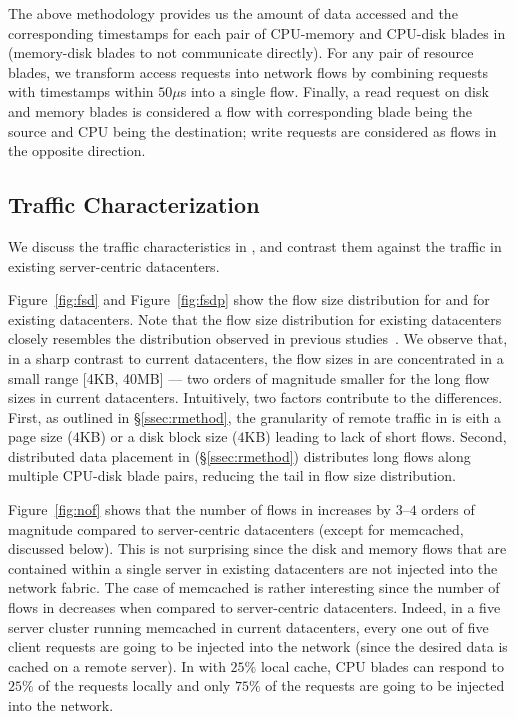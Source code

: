 The above methodology provides us the amount of data accessed and the corresponding timestamps for each pair of CPU-memory and CPU-disk blades in \dis (memory-disk blades to not communicate directly). For any pair of resource blades, we transform access requests into network flows by combining requests with timestamps within $50\mu$s into a single flow.  Finally, a read request on disk and memory blades is considered a flow with corresponding blade being the source and CPU being the destination; write requests are considered as flows in the opposite direction.

\subsection{Traffic Characterization} 
\label{ssec:flc}
We discuss the traffic characteristics in \dis, and contrast them against the traffic in existing server-centric datacenters.

Figure~\ref{fig:fsd} and Figure~\ref{fig:fsdp} show the flow size distribution for \dis and for existing datacenters. Note that the flow size distribution for existing datacenters closely resembles the distribution observed in previous studies~\cite{srikanth, theo}. We observe that, in a sharp contrast to current datacenters, the flow sizes in \dis are concentrated in a small range [4KB, 40MB] --- two orders of magnitude smaller for the long flow sizes in current datacenters. Intuitively, two factors contribute to the differences. First, as outlined in \S\ref{ssec:rmethod}, the granularity of remote traffic in \dis is eith a page size ($4$KB) or a disk block size ($4$KB) leading to lack of short flows. Second, distributed data placement in \dis (\S\ref{ssec:rmethod}) distributes long flows along multiple CPU-disk blade pairs, reducing the tail in flow size distribution.

Figure~\ref{fig:nof} shows that the number of flows in \dis increases by $3$--$4$ orders of magnitude compared to server-centric datacenters (except for memcached, discussed below). This is not surprising since the disk and memory flows that are contained within a single server in existing datacenters are not injected into the network fabric. The case of memcached is rather interesting since the number of flows in \dis decreases when compared to server-centric datacenters. Indeed, in a five server cluster running memcached in current datacenters, every one out of five client requests are going to be injected into the network (since the desired data is cached on a remote server). In \dis with $25\%$ local cache, CPU blades can respond to $25\%$ of the requests locally and only $75\%$ of the requests are going to be injected into the network.

